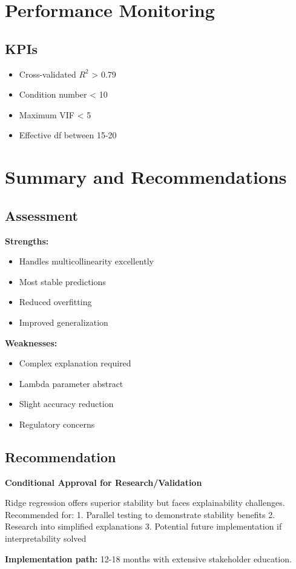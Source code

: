 \section{Performance Monitoring}

\subsection{KPIs}

\begin{itemize}
    \item Cross-validated $R^2$ > 0.79
    \item Condition number < 10
    \item Maximum VIF < 5
    \item Effective df between 15-20
\end{itemize}

\section{Summary and Recommendations}

\subsection{Assessment}

\textbf{Strengths:}
\begin{itemize}
    \item Handles multicollinearity excellently
    \item Most stable predictions
    \item Reduced overfitting
    \item Improved generalization
\end{itemize}

\textbf{Weaknesses:}
\begin{itemize}
    \item Complex explanation required
    \item Lambda parameter abstract
    \item Slight accuracy reduction
    \item Regulatory concerns
\end{itemize}

\subsection{Recommendation}

\textbf{Conditional Approval for Research/Validation}

Ridge regression offers superior stability but faces explainability challenges. Recommended for:
1. Parallel testing to demonstrate stability benefits
2. Research into simplified explanations
3. Potential future implementation if interpretability solved

\textbf{Implementation path:} 12-18 months with extensive stakeholder education.
